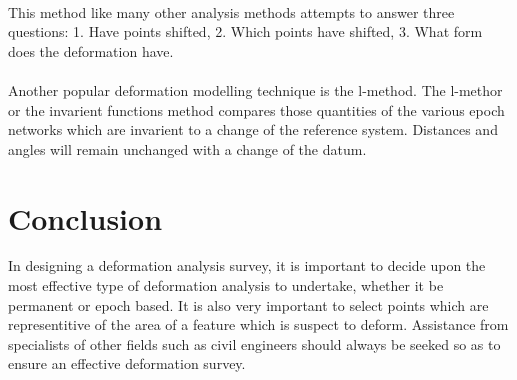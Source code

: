\documentclass{article}
\begin{document}
\paragraph{}
This method like many other analysis methods attempts to answer three questions:
1. Have points shifted, 2. Which points have shifted, 3. What form does the deformation 
have.
\paragraph{}
Another popular deformation modelling technique is the l-method. The l-methor or the
invarient functions method compares those quantities of the various epoch networks
which are invarient to a change of the reference system. Distances and angles will
remain unchanged with a change of the datum.

\section{Conclusion}
In designing a deformation analysis survey, it is important to decide upon the most
effective type of deformation analysis to undertake, whether it be permanent or epoch 
based. It is also very important to select points which are representitive of the area
of a feature which is suspect to deform. Assistance from specialists of other fields such as civil
engineers should always be seeked so as to ensure an effective deformation survey.
\end{document}
